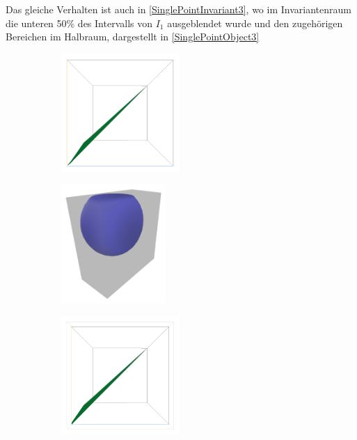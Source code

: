 \documentclass[a4paper,fontsize=12pt,toc=bib,halfparskip,ngerman]{scrartcl}
\begin{document}
Das gleiche Verhalten ist auch in \cref{SinglePointInvariant3}, wo im Invariantenraum die unteren 50\% des Intervalls von $I_1$ ausgeblendet wurde und den zugeh\"origen Bereichen im Halbraum, dargestellt in \cref{SinglePointObject3}





\begin{figure}
	\begin{subfigure}{0.49\textwidth}
		\centering
		\includegraphics[height=4.5cm]{pictures/results/SinglePoint/SinglePoint_InvariantSpace1.png}
		\subcaption{}
		\label{SinglePointInvariant1}
	\end{subfigure}
	\hspace*{\fill}
	\begin{subfigure}{0.49\textwidth}
		\centering
		\includegraphics[height=4.5cm]{pictures/results/SinglePoint/SinglePoint_Object1.png}
		\subcaption{}
		\label{SinglePointObject1}
	\end{subfigure}
	\medskip
	\begin{subfigure}{0.49\textwidth}
		\centering
		\includegraphics[height=4.5cm]{pictures/results/SinglePoint/SinglePoint_InvariantSpace2.png}

\end{subfigure}
\end{figure}
\end{document}
